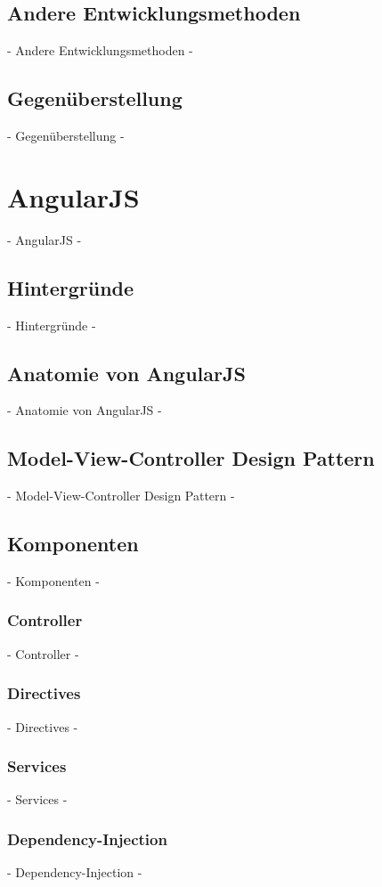 

\subsection{Andere Entwicklungsmethoden}
 - Andere Entwicklungsmethoden - 
\subsection{Gegenüberstellung}
 - Gegenüberstellung -

\newpage
\section{AngularJS}
 - AngularJS -

\subsection{Hintergründe}
 - Hintergründe -
\subsection{Anatomie von AngularJS}
 - Anatomie von AngularJS -
\subsection{Model-View-Controller Design Pattern}
 - Model-View-Controller Design Pattern -
\subsection{Komponenten}
 - Komponenten -

\subsubsection{Controller}
 - Controller -
\subsubsection{Directives}
 - Directives -
\subsubsection{Services}
 - Services -
\subsubsection{Dependency-Injection}
 - Dependency-Injection -
